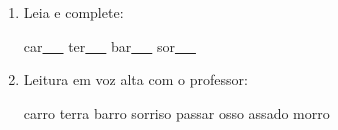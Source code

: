 \begin{exercicio}
\begin{enumerate}[resume]
\begin{enumerate}[label=(\alph*)]
    \item O som da unidade é: ( ) oral ( ) nasal ( ) vibrante

    \item A primeira sílaba de CARRO é: ( ) RRA ( ) RRO

    \item As palavras da unidade aparecem: ( ) no início ( ) no meio ( ) no fim das palavras

  \end{enumerate}

  \item Leia e complete:
  \begin{center}
  car\underline{~~~} \quad ter\underline{~~~} \quad bar\underline{~~~} \quad sor\underline{~~~}
  \end{center}

  \item Leitura em voz alta com o professor:
  \begin{center}
  carro \quad terra \quad barro \quad sorriso \quad passar \quad osso \quad assado \quad morro
  \end{center}

\end{enumerate}

\end{exercicio}



